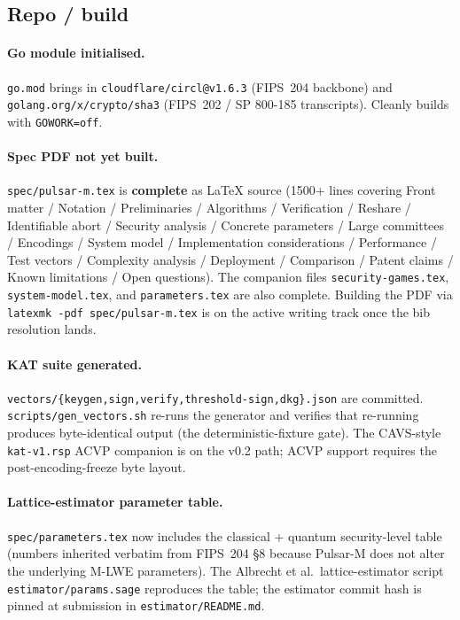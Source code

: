 \subsection{Repo / build}

\paragraph{Go module initialised.}
\texttt{go.mod} brings in \texttt{cloudflare/circl@v1.6.3} (FIPS~204
backbone) and \texttt{golang.org/x/crypto/sha3} (FIPS~202 / SP
800-185 transcripts). Cleanly builds with \texttt{GOWORK=off}.

\paragraph{Spec PDF not yet built.}
\texttt{spec/pulsar-m.tex} is \textbf{complete} as LaTeX source
(1500+ lines covering Front matter / Notation / Preliminaries /
Algorithms / Verification / Reshare / Identifiable abort / Security
analysis / Concrete parameters / Large committees / Encodings /
System model / Implementation considerations / Performance / Test
vectors / Complexity analysis / Deployment / Comparison / Patent
claims / Known limitations / Open questions). The companion files
\texttt{security-games.tex}, \texttt{system-model.tex}, and
\texttt{parameters.tex} are also complete. Building the PDF via
\texttt{latexmk -pdf spec/pulsar-m.tex} is on the active writing
track once the bib resolution lands.

\paragraph{KAT suite generated.}
\texttt{vectors/\{keygen,sign,verify,threshold-sign,dkg\}.json} are
committed. \texttt{scripts/gen\_vectors.sh} re-runs the generator
and verifies that re-running produces byte-identical output (the
deterministic-fixture gate). The CAVS-style \texttt{kat-v1.rsp} ACVP
companion is on the v0.2 path; ACVP support requires the
post-encoding-freeze byte layout.

\paragraph{Lattice-estimator parameter table.}
\texttt{spec/parameters.tex} now includes the classical + quantum
security-level table (numbers inherited verbatim from FIPS~204 \S8
because Pulsar-M does not alter the underlying M-LWE parameters).
The Albrecht et al.\ lattice-estimator script
\texttt{estimator/params.sage} reproduces the table; the estimator
commit hash is pinned at submission in
\texttt{estimator/README.md}.

